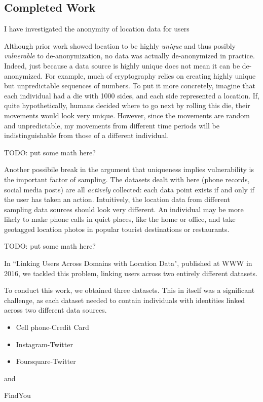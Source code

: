 \subsection{Completed Work}
I have investigated the anonymity of location data for users

Although prior work showed location to be highly \emph{unique} and thus posibly \emph{vulnerable} to de-anonymization, no data was actually de-anonymized in practice.
Indeed, just because a data source is highly unique does not mean it can be de-anonymized.
For example, much of cryptography relies on creating highly unique but unpredictable sequences of numbers.
To put it more concretely, imagine that each individual had a die with 1000 sides, and each side represented a location.
If, quite hypothetically, humans decided where to go next by rolling this die, their movements would look very unique.
However, since the movements are random and unpredictable, my movements from different time periods will be indistinguishable from those of a different individual.

TODO: put some math here?

Another possibile break in the argument that uniqueness implies vulnerability is the important factor of sampling.
The datasets dealt with here (phone records, social media posts) are all \emph{actively} collected: each data point exists if and only if the user has taken an action.
Intuitively, the location data from different sampling data sources should look very different.
An individual may be more likely to make phone calls in quiet places, like the home or office, and take geotagged location photos in popular tourist destinations or restaurants.

TODO: put some math here?

In ``Linking Users Across Domains with Location Data", published at WWW in 2016, we tackled this problem, linking users across two entirely different datasets.


To conduct this work, we obtained three datasets.
This in itself was a significant challenge, as each dataset needed to contain individuals with identities linked across two different data sources.
\begin{itemize}
  \item Cell phone-Credit Card
  \item Instagram-Twitter
  \item Foursquare-Twitter
\end{itemize}



and

FindYou
